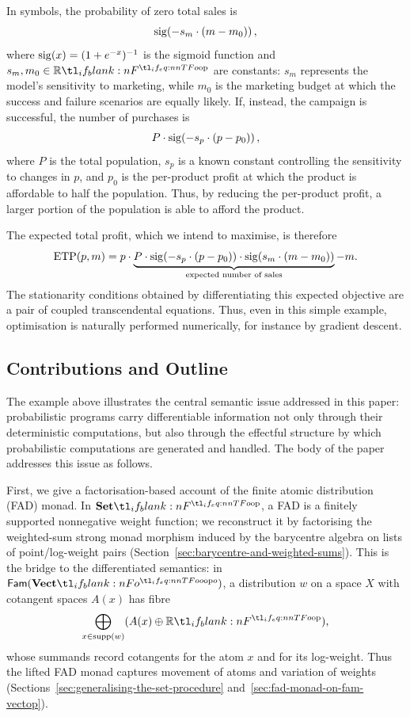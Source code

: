 \documentclass[11pt,a4paper]{article}
\theoremstyle{definition}
\theoremstyle{remark}
\providecommand{\Fam}[1]{\mathsf{Fam}(#1)}
\providecommand{\supp}{\operatorname{supp}}
\begin{document}
In symbols, the probability of zero total sales is
\[
\fn[n]{\opn{sig}}{-s_m\cdot(m-m_0)},
\]
where \( \fn[n]{\opn{sig}}{x}=(1+e^{-x})^{-1} \) is the sigmoid function and
\(s_m,m_0\in\R\) are constants: \(s_m\) represents the model's
sensitivity to marketing, while \(m_0\) is the marketing budget at which the
success and failure scenarios are equally likely.
If, instead, the campaign is successful, the number of purchases is
\[
P\cdot \fn[n]{\opn{sig}}{-s_p\cdot(p-p_0)},
\]
where \(P\) is the total population, \(s_p\) is a known
constant controlling the sensitivity to changes in \(p\), and \(p_0\) is the
per-product profit at which the product is affordable to half the population.
Thus, by reducing the per-product profit, a larger portion of the population is
able to afford the product.

The expected total profit, which we intend to maximise, is therefore
\begin{equation*}
	\fn[n]{\opn{ETP}}{p,m}
	=
	p \cdot
	\underbrace{
		P
		\cdot \fn[n]{\opn{sig}}{-s_p\cdot(p-p_0)}
		\cdot \fn[n]{\opn{sig}}{s_m\cdot(m-m_0)}
	}_{\text{expected number of sales}}
	- m .
\end{equation*}
The stationarity conditions obtained by differentiating this expected objective
are a pair of coupled transcendental equations. Thus, even in this simple
example, optimisation is naturally performed numerically, for instance by
gradient descent.

\subsection{Contributions and Outline}

The example above illustrates the central semantic issue addressed in this
paper: probabilistic programs carry differentiable information not only through
their deterministic computations, but also through the effectful structure by
which probabilistic computations are generated and handled. The body of the
paper addresses this issue as follows.

First, we give a factorisation-based account of the finite atomic distribution
(FAD) monad. In \( \Set \), a FAD is a finitely supported nonnegative weight
function; we reconstruct it by factorising the weighted-sum strong monad
morphism induced by the barycentre algebra on lists of point/log-weight pairs
(Section~\ref{sec:barycentre-and-weighted-sums}). This is the bridge to the
differentiated semantics: in \( \Fam{\Vect[o]} \), a distribution \(w\) on a
space \(X\) with cotangent spaces \(A(x)\) has fibre
\[\bigoplus_{x\in\supp(w)}(A(x)\oplus\R),\] whose summands record cotangents
for the atom \(x\) and for its log-weight. Thus the lifted FAD monad captures
movement of atoms and variation of weights
(Sections~\ref{sec:generalising-the-set-procedure}
and~\ref{sec:fad-monad-on-fam-vectop}).
\end{document}
